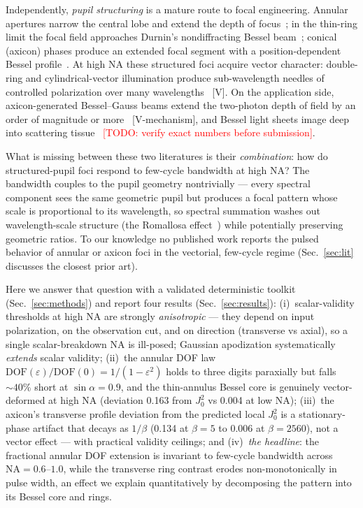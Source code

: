 \documentclass[11pt]{article}
\newcommand{\todo}[1]{\textcolor{red}{[TODO: #1]}}
\begin{document}
Independently, \emph{pupil structuring} is a mature route to focal
engineering. Annular apertures narrow the central lobe and extend the depth of
focus~\cite{SheppardWilson1978,Sheppard1988}; in the thin-ring limit the focal
field approaches Durnin's nondiffracting Bessel beam~\cite{Durnin1987}; conical
(axicon) phases produce an extended focal segment with a position-dependent
Bessel profile~\cite{McLeod1954,Durnin1987}. At high NA these structured foci
acquire vector character: double-ring and cylindrical-vector illumination
produce sub-wavelength needles of controlled polarization over many
wavelengths~\cite{Wang2010needle,Guo2014needle} [V]. On the application side,
axicon-generated Bessel--Gauss beams extend the two-photon depth of field by an
order of magnitude or more~\cite{Betzig2014Bessel} [V-mechanism], and Bessel
light sheets image deep into scattering tissue~\cite{Zhao2014BesselSIM}
\todo{verify exact numbers before submission}.

What is missing between these two literatures is their \emph{combination}: how
do structured-pupil foci respond to few-cycle bandwidth at high NA? The
bandwidth couples to the pupil geometry nontrivially --- every spectral
component sees the same geometric pupil but produces a focal pattern whose
scale is proportional to its wavelength, so spectral summation washes out
wavelength-scale structure (the Romallosa effect~\cite{Romallosa2003}) while
potentially preserving geometric ratios. To our knowledge no published work
reports the pulsed behavior of annular or axicon foci in the vectorial,
few-cycle regime (Sec.~\ref{sec:lit} discusses the closest prior art).

Here we answer that question with a validated deterministic toolkit
(Sec.~\ref{sec:methods}) and report four results (Sec.~\ref{sec:results}):
(i)~scalar-validity thresholds at high NA are strongly \emph{anisotropic} ---
they depend on input polarization, on the observation cut, and on direction
(transverse vs axial), so a single scalar-breakdown NA is ill-posed; Gaussian
apodization systematically \emph{extends} scalar validity;
(ii)~the annular DOF law $\mathrm{DOF}(\varepsilon)/\mathrm{DOF}(0)
=1/(1-\varepsilon^2)$ holds to three digits paraxially but falls ${\sim}40\%$
short at $\sin\alpha=0.9$, and the thin-annulus Bessel core is genuinely
vector-deformed at high NA (deviation 0.163 from $J_0^2$ vs 0.004 at low NA);
(iii)~the axicon's transverse profile deviation from the predicted local
$J_0^2$ is a stationary-phase artifact that decays as $1/\beta$ (0.134 at
$\beta{=}5$ to 0.006 at $\beta{=}2560$), not a vector effect --- with practical
validity ceilings; and
(iv)~\emph{the headline}: the fractional annular DOF extension is invariant to
few-cycle bandwidth across $\mathrm{NA}=0.6$--$1.0$, while the transverse ring
contrast erodes non-monotonically in pulse width, an effect we explain
quantitatively by decomposing the pattern into its Bessel core and rings.
\end{document}
